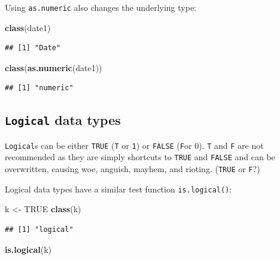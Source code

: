 \documentclass[]{book}
\newenvironment{Shaded}{\begin{snugshade}}{\end{snugshade}}
\newcommand{\KeywordTok}[1]{\textcolor[rgb]{0.13,0.29,0.53}{\textbf{#1}}}
\newcommand{\NormalTok}[1]{#1}
\newcommand{\OtherTok}[1]{\textcolor[rgb]{0.56,0.35,0.01}{#1}}
\newcommand{\StringTok}[1]{\textcolor[rgb]{0.31,0.60,0.02}{#1}}
\theoremstyle{definition}
\theoremstyle{definition}
\theoremstyle{definition}
\theoremstyle{remark}
\begin{document}
Using \texttt{as.numeric} also changes the underlying type:

\begin{Shaded}
\begin{Highlighting}[]
\KeywordTok{class}\NormalTok{(date1)}
\end{Highlighting}
\end{Shaded}

\begin{verbatim}
## [1] "Date"
\end{verbatim}

\begin{Shaded}
\begin{Highlighting}[]
\KeywordTok{class}\NormalTok{(}\KeywordTok{as.numeric}\NormalTok{(date1))}
\end{Highlighting}
\end{Shaded}

\begin{verbatim}
## [1] "numeric"
\end{verbatim}

\hypertarget{logical-data-types}{%
\subsection{\texorpdfstring{\texttt{Logical} data
types}{Logical data types}}\label{logical-data-types}}

\texttt{Logical}s can be either \texttt{TRUE} (\texttt{T} or \texttt{1})
or \texttt{FALSE} (\texttt{F}or 0). \texttt{T} and \texttt{F} are not
recommended as they are simply shortcuts to \texttt{TRUE} and
\texttt{FALSE} and can be overwritten, causing woe, anguish, mayhem, and
rioting. (\texttt{TRUE} or \texttt{F}?)

Logical data types have a similar test function \texttt{is.logical()}:

\begin{Shaded}
\begin{Highlighting}[]
\NormalTok{k <-}\StringTok{ }\OtherTok{TRUE}
\KeywordTok{class}\NormalTok{(k)}
\end{Highlighting}
\end{Shaded}

\begin{verbatim}
## [1] "logical"
\end{verbatim}

\begin{Shaded}
\begin{Highlighting}[]
\KeywordTok{is.logical}\NormalTok{(k)}
\end{Highlighting}
\end{Shaded}
\end{document}
